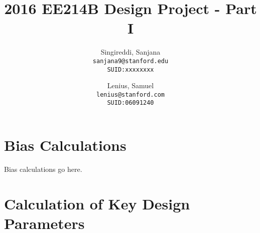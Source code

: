 \documentclass[12pt,a4paper]{article}
\begin{document}




\author{
  Singireddi, Sanjana\\
  \texttt{sanjana9@stanford.edu}\\
  \texttt{SUID:xxxxxxxx}
  \and
  Lenius, Samuel\\
  \texttt{lenius@stanford.com}\\
  \texttt{SUID:06091240}
}

\title{2016 EE214B Design Project - Part I}

\maketitle

\pagebreak



\section{Bias Calculations}
\par

Bias calculations go here.\par


\pagebreak


\section{Calculation of Key Design Parameters}
\end{document}
